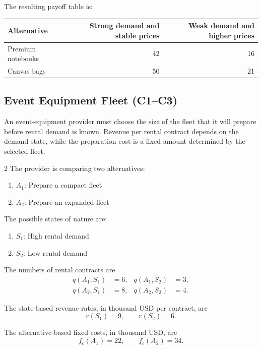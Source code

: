 The resulting payoff table is:

\begin{center}
	\begin{tabular}{lrr}
		\toprule
		Alternative
		& Strong demand and stable prices
		& Weak demand and higher prices \\
		\midrule
		Premium notebooks & 42 & 16 \\
		Canvas bags & 50 & 21 \\
		\bottomrule
	\end{tabular}
\end{center}


\subsection{Event Equipment Fleet (C1--C3)}
\label{sec:problem6-event-equipment-fleet-c1-c3}

An event-equipment provider must choose the size of the fleet that it will
prepare before rental demand is known. Revenue per rental contract depends on
the demand state, while the preparation cost is a fixed amount determined by
the selected fleet.

\begin{multicols}{2}
	The provider is comparing two alternatives:
	\begin{enumerate}[label=\arabic*.]
		\item \(A_1\): Prepare a compact fleet
		\item \(A_2\): Prepare an expanded fleet
	\end{enumerate}
	
	The possible states of nature are:
	\begin{enumerate}[label=\arabic*.]
		\item \(S_1\): High rental demand
		\item \(S_2\): Low rental demand
	\end{enumerate}
	
	\columnbreak
	
	The numbers of rental contracts are
	\[
	\begin{aligned}
		q(A_1,S_1)&=6,
		&
		q(A_1,S_2)&=3,
		\\
		q(A_2,S_1)&=8,
		&
		q(A_2,S_2)&=4.
	\end{aligned}
	\]
	
	The state-based revenue rates, in thousand USD per contract, are
	\[
	r(S_1)=9,
	\qquad
	r(S_2)=6.
	\]
	
	The alternative-based fixed costs, in thousand USD, are
	\[
	f_c(A_1)=22,
	\qquad
	f_c(A_2)=34.
	\]
\end{multicols}

